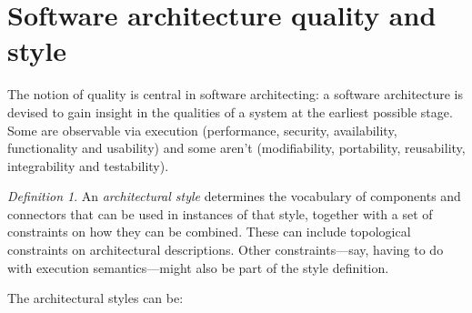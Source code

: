 \documentclass[12pt, a4paper]{report}
\theoremstyle{remark}
\newtheorem*{remark}{Definition}
\begin{document}
\section{Software architecture quality and style}
    The notion of quality is central in software architecting: a software architecture is devised to gain insight in the qualities of a system at the earliest possible stage. Some are observable via execution (performance, security, availability, functionality and usability) and some aren't (modifiability, portability, reusability, integrability and testability). 
    \begin{remark}
        An \emph{architectural style} determines the vocabulary of components and connectors that can be used in instances of that style, together with a set of constraints on how they can be combined. These can include topological constraints on architectural descriptions. Other constraints—say, having to do with execution semantics—might also be part of the style definition.
    \end{remark}
    The architectural styles can be: 
\end{document}
